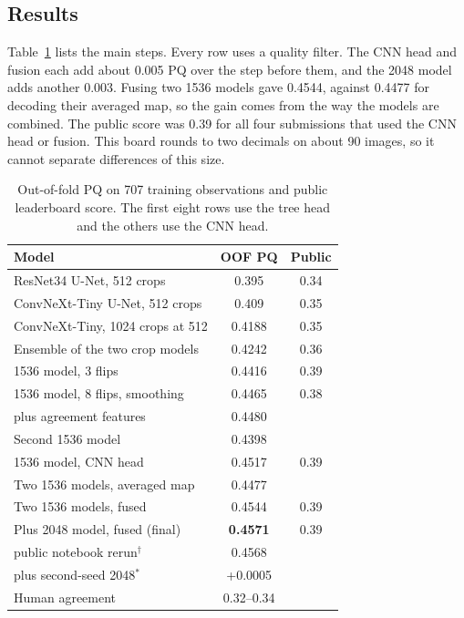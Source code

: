 \documentclass[sigconf]{acmart}
\begin{document}
\subsection{Results}

Table~\ref{tab:results} lists the main steps. Every row uses a quality filter. The CNN head and fusion each add about 0.005 PQ over the step before them, and the 2048 model adds another 0.003. Fusing two 1536 models gave 0.4544, against 0.4477 for decoding their averaged map, so the gain comes from the way the models are combined. The public score was 0.39 for all four submissions that used the CNN head or fusion. This board rounds to two decimals on about 90 images, so it cannot separate differences of this size.

\begin{table}[t]
\centering
\small
\caption{Out-of-fold PQ on 707 training observations and public leaderboard score. The first eight rows use the tree head and the others use the CNN head.}
\label{tab:results}
\begin{tabular}{lcc}
\toprule
Model & OOF PQ & Public \\
\midrule
ResNet34 U-Net, 512 crops & 0.395 & 0.34 \\
ConvNeXt-Tiny U-Net, 512 crops & 0.409 & 0.35 \\
ConvNeXt-Tiny, 1024 crops at 512 & 0.4188 & 0.35 \\
Ensemble of the two crop models & 0.4242 & 0.36 \\
1536 model, 3 flips & 0.4416 & 0.39 \\
1536 model, 8 flips, smoothing & 0.4465 & 0.38 \\
\quad plus agreement features & 0.4480 & \\
Second 1536 model & 0.4398 & \\
\midrule
1536 model, CNN head & 0.4517 & 0.39 \\
Two 1536 models, averaged map & 0.4477 & \\
Two 1536 models, fused & 0.4544 & 0.39 \\
Plus 2048 model, fused (final) & \textbf{0.4571} & 0.39 \\
\quad public notebook rerun$^{\dagger}$ & 0.4568 & \\
\quad plus second-seed 2048$^{*}$ & +0.0005 & \\
\midrule
Human agreement & 0.32--0.34 & \\
\bottomrule
\end{tabular}

\end{table}
\end{document}
